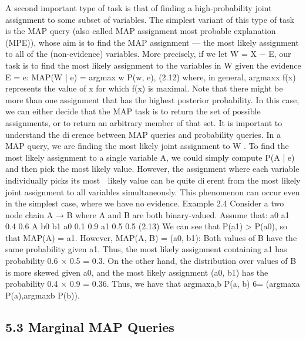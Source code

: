 A second important type of task is that of finding a high-probability joint assignment to some subset of variables. The simplest variant of this type of task is the MAP query (also called MAP assignment most probable explanation (MPE)), whose aim is to find the MAP assignment — the most likely assignment to all of the (non-evidence) variables. More precisely, if we let W = X − E, our task is to find the most likely assignment to the variables in W given the evidence E = e: MAP(W | e) = argmax w P(w, e), (2.12) where, in general, argmaxx f(x) represents the value of x for which f(x) is maximal. Note that there might be more than one assignment that has the highest posterior probability. In this case, we can either decide that the MAP task is to return the set of possible assignments, or to return an arbitrary member of that set. It is important to understand the dierence between MAP queries and probability queries. In a MAP query, we are finding the most likely joint assignment to W . To find the most likely assignment to a single variable A, we could simply compute P(A | e) and then pick the most likely value. However, the assignment where each variable individually picks its most  likely value can be quite dierent from the most likely joint assignment to all variables simultaneously. This phenomenon can occur even in the simplest case, where we have no evidence. Example 2.4 Consider a two node chain A → B where A and B are both binary-valued. Assume that: a0 a1 0.4 0.6 A b0 b1 a0 0.1 0.9 a1 0.5 0.5 (2.13) We can see that P(a1) > P(a0), so that MAP(A) = a1. However, MAP(A, B) = (a0, b1): Both values of B have the same probability given a1. Thus, the most likely assignment containing a1 has probability 0.6 × 0.5 = 0.3. On the other hand, the distribution over values of B is more skewed given a0, and the most likely assignment (a0, b1) has the probability 0.4 × 0.9 = 0.36. Thus, we have that argmaxa,b P(a, b) 6= (argmaxa P(a),argmaxb P(b)).

\subsection{5.3 Marginal MAP Queries}

